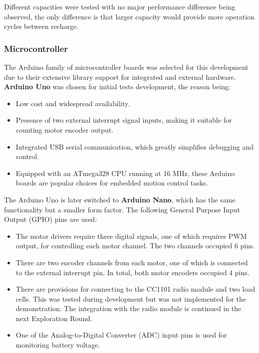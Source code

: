 Different capacities were tested with no major performance difference being observed, the only difference is that larger capacity would provide more operation cycles between recharge.

\subsubsection{Microcontroller}
\label{subsubsection:exploration-1-microcontroller}

The Arduino family of microcontroller boards was selected for this development due to their extensive library support for integrated and external hardware. 
\textbf{Arduino Uno} was chosen for initial tests development, the reason being:

\begin{itemize}[nosep]
    \item Low cost and widespread availability.
    \item Presence of two external interrupt signal inputs, making it suitable for counting motor encoder output. 
    \item Integrated USB serial communication, which greatly simplifies debugging and control.
    \item Equipped with an ATmega328 CPU running at 16 MHz, these Arduino boards are popular choices for embedded motion control tasks.
\end{itemize}

The Arduino Uno is later switched to \textbf{Arduino Nano}, which has the same functionality but a smaller form factor. The following General Purpose Input Output (GPIO) pins are used:

\begin{itemize}[nosep]
    \item The motor drivers require three digital signals, one of which requires PWM output, for controlling each motor channel. The two channels occupied 6 pins. 
    \item There are two encoder channels from each motor, one of which is connected to the external interrupt pin. In total, both motor encoders occupied 4 pins.
    \item There are provisions for connecting to the CC1101 radio module and two load cells. This was tested during development but was not implemented for the demonstration. The integration with the radio module is continued in the next Exploration Round.
    \item One of the Analog-to-Digital Converter (ADC) input pins is used for monitoring battery voltage.
\end{itemize}

